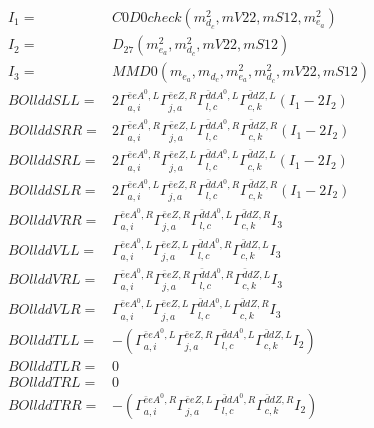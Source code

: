 \documentclass[A4,landscape]{article}
\begin{document}
\begin{align} 
I_1 = & C0D0check(m^2_{d_{{c}}}, mV22, mS12, m^2_{e_{{a}}}) \\ 
I_2 = & D_{27}(m^2_{e_{{a}}}, m^2_{d_{{c}}}, mV22, mS12) \\ 
I_3 = & MMD0(m_{e_{{a}}}, m_{d_{{c}}}, m^2_{e_{{a}}}, m^2_{d_{{c}}}, mV22, mS12) \\ 
  BOllddSLL= & 2  \Gamma^{\bar{e}e A^0 ,L}_{a, i} \Gamma^{\bar{e}e Z ,R}_{j, a} \Gamma^{\bar{d}d A^0 ,L}_{l, c} \Gamma^{\bar{d}d Z ,L}_{c, k} (I_1 - 2 I_2) \\ 
  BOllddSRR= & 2  \Gamma^{\bar{e}e A^0 ,R}_{a, i} \Gamma^{\bar{e}e Z ,L}_{j, a} \Gamma^{\bar{d}d A^0 ,R}_{l, c} \Gamma^{\bar{d}d Z ,R}_{c, k} (I_1 - 2 I_2) \\ 
  BOllddSRL= & 2  \Gamma^{\bar{e}e A^0 ,R}_{a, i} \Gamma^{\bar{e}e Z ,L}_{j, a} \Gamma^{\bar{d}d A^0 ,L}_{l, c} \Gamma^{\bar{d}d Z ,L}_{c, k} (I_1 - 2 I_2) \\ 
  BOllddSLR= & 2  \Gamma^{\bar{e}e A^0 ,L}_{a, i} \Gamma^{\bar{e}e Z ,R}_{j, a} \Gamma^{\bar{d}d A^0 ,R}_{l, c} \Gamma^{\bar{d}d Z ,R}_{c, k} (I_1 - 2 I_2) \\ 
  BOllddVRR= &  \Gamma^{\bar{e}e A^0 ,R}_{a, i} \Gamma^{\bar{e}e Z ,R}_{j, a} \Gamma^{\bar{d}d A^0 ,L}_{l, c} \Gamma^{\bar{d}d Z ,R}_{c, k} I_3 \\ 
  BOllddVLL= &  \Gamma^{\bar{e}e A^0 ,L}_{a, i} \Gamma^{\bar{e}e Z ,L}_{j, a} \Gamma^{\bar{d}d A^0 ,R}_{l, c} \Gamma^{\bar{d}d Z ,L}_{c, k} I_3 \\ 
  BOllddVRL= &  \Gamma^{\bar{e}e A^0 ,R}_{a, i} \Gamma^{\bar{e}e Z ,R}_{j, a} \Gamma^{\bar{d}d A^0 ,R}_{l, c} \Gamma^{\bar{d}d Z ,L}_{c, k} I_3 \\ 
  BOllddVLR= &  \Gamma^{\bar{e}e A^0 ,L}_{a, i} \Gamma^{\bar{e}e Z ,L}_{j, a} \Gamma^{\bar{d}d A^0 ,L}_{l, c} \Gamma^{\bar{d}d Z ,R}_{c, k} I_3 \\ 
  BOllddTLL= & -( \Gamma^{\bar{e}e A^0 ,L}_{a, i} \Gamma^{\bar{e}e Z ,R}_{j, a} \Gamma^{\bar{d}d A^0 ,L}_{l, c} \Gamma^{\bar{d}d Z ,L}_{c, k} I_2) \\ 
  BOllddTLR= & 0 \\ 
  BOllddTRL= & 0 \\ 
  BOllddTRR= & -( \Gamma^{\bar{e}e A^0 ,R}_{a, i} \Gamma^{\bar{e}e Z ,L}_{j, a} \Gamma^{\bar{d}d A^0 ,R}_{l, c} \Gamma^{\bar{d}d Z ,R}_{c, k} I_2) \\ 
\end{align} 
\end{document}
